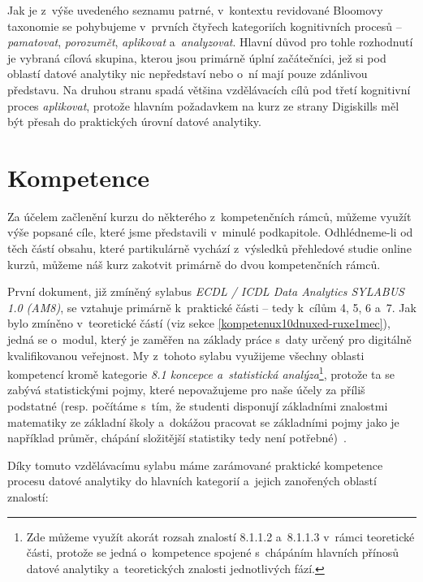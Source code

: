 Jak je z~výše uvedeného seznamu patrné, v~kontextu revidované Bloomovy taxonomie se pohybujeme v~prvních čtyřech kategoriích kognitivních procesů -- \emph{pamatovat}, \emph{porozumět}, \emph{aplikovat} a~\emph{analyzovat}. Hlavní důvod pro tohle rozhodnutí je vybraná cílová skupina, kterou jsou primárně úplní začátečníci, jež si pod oblastí datové analytiky nic nepředstaví nebo o~ní mají pouze zdánlivou představu. Na druhou stranu spadá většina vzdělávacích cílů pod třetí kognitivní proces \emph{aplikovat}, protože hlavním požadavkem na kurz ze strany Digiskills měl být přesah do praktických úrovní datové analytiky.

\hypertarget{kompetence}{%
\section{Kompetence}\label{kompetence}}

Za účelem začlenění kurzu do některého z~kompetenčních rámců, můžeme využít výše popsané cíle, které jsme představili v~minulé podkapitole. Odhlédneme-li od těch částí obsahu, které partikulárně vychází z~výsledků přehledové studie online kurzů, můžeme náš kurz zakotvit primárně do dvou kompetenčních rámců.

První dokument, již zmíněný sylabus \emph{ECDL / ICDL Data Analytics SYLABUS 1.0 (AM8)}, se vztahuje primárně k~praktické části -- tedy k~cílům 4, 5, 6 a~7. Jak bylo zmíněno v~teoretické částí (viz sekce \ref{kompetenux10dnuxed-ruxe1mec}), jedná se o~modul, který je zaměřen na základy práce s~daty určený pro digitálně kvalifikovanou veřejnost. My z~tohoto sylabu využijeme všechny oblasti kompetencí kromě kategorie \emph{8.1 koncepce a~statistická analýza}\footnote{Zde můžeme využít akorát rozsah znalostí 8.1.1.2 a~8.1.1.3 v~rámci teoretické části, protože se jedná o~kompetence spojené s~chápáním hlavních přínosů datové analytiky a~teoretických znalosti jednotlivých fází.}, protože ta se zabývá statistickými pojmy, které nepovažujeme pro naše účely za příliš podstatné (resp. počítáme s~tím, že studenti disponují základními znalostmi matematiky ze základní školy a~dokážou pracovat se základními pojmy jako je například průměr, chápání složitější statistiky tedy není potřebné)~\parencite{ecdl17}.

Díky tomuto vzdělávacímu sylabu máme zarámované praktické kompetence procesu datové analytiky do hlavních kategorií a~jejich zanořených oblastí znalostí:

